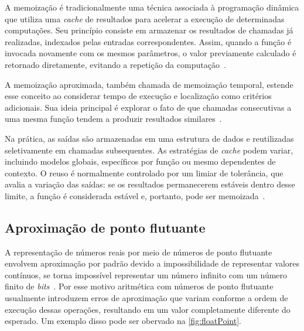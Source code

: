 A memoização é tradicionalmente uma técnica associada à programação dinâmica que utiliza uma \textit{cache} de resultados para acelerar a execução de determinadas computações. Seu princípio consiste em armazenar os resultados de chamadas já realizadas, indexados pelas entradas correspondentes. Assim, quando a função é invocada novamente com os mesmos parâmetros, o valor previamente calculado é retornado diretamente, evitando a repetição da computação~\cite{michie1968}.

A memoização aproximada, também chamada de memoização temporal, estende esse conceito ao considerar tempo de execução e localização como critérios adicionais. Sua ideia principal é explorar o fato de que chamadas consecutivas a uma mesma função tendem a produzir resultados similares~\cite{tziantzioulis2018}.

Na prática, as saídas são armazenadas em uma estrutura de dados e reutilizadas seletivamente em chamadas subsequentes. As estratégias de \textit{cache} podem variar, incluindo modelos globais, específicos por função ou mesmo dependentes de contexto. O reuso é normalmente controlado por um limiar de tolerância, que avalia a variação das saídas: se os resultados permanecerem estáveis dentro desse limite, a função é considerada estável e, portanto, pode ser memoizada~\cite{tziantzioulis2018}.

\subsection{Aproximação de ponto flutuante}\label{subsec:pontoFlut}

A representação de números reais por meio de números de ponto flutuante envolvem aproximação por padrão devido a impossibilidade de representar valores contínuos, se torna impossível representar um número infinito com um número finito de \textit{bits}~\cite{monniaux2008}. Por esse motivo aritmética com números de ponto flutuante usualmente introduzem erros de aproximação que variam conforme a ordem de execução dessas operações, resultando em um valor completamente diferente do esperado. Um exemplo disso pode ser obervado na \autoref{fig:floatPoint}.

